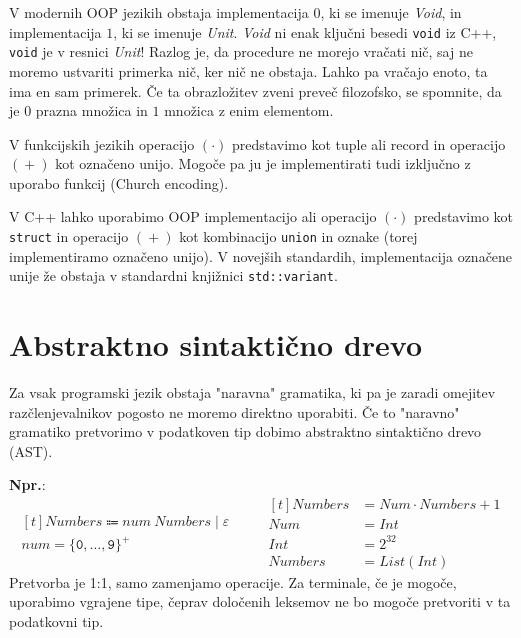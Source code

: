 \documentclass{report}
\newcommand{\Ex}{\textbf{Npr.}:\ }
\newcommand{\Null}{\varepsilon}
\newcommand{\Char}[1]{\texttt{#1}}
\newcommand{\Seq}{\cdot}
\newcommand{\Spc}{\ }
\newcommand{\Union}{\mathrel{|}}
\newcommand{\Sum}{\mathrel{+}}
\newcommand{\KleenePlus}[1]{#1^+}
\newcommand{\Arrow}{\Coloneq}
\newcommand{\NT}[1]{{#1}}
\newcommand{\T}[1]{{#1}}
\begin{document}
V modernih OOP jezikih obstaja implementacija $0$, ki se imenuje \emph{Void}, in implementacija $1$, ki se imenuje \emph{Unit}.
\emph{Void} ni enak ključni besedi \texttt{void} iz C++, \texttt{void} je v resnici \emph{Unit}!
Razlog je, da procedure ne morejo vračati nič, saj ne moremo ustvariti primerka nič, ker nič ne obstaja.
Lahko pa vračajo enoto, ta ima en sam primerek.
Če ta obrazložitev zveni preveč filozofsko, se spomnite, da je $0$ prazna množica in $1$ množica z enim elementom.

V funkcijskih jezikih operacijo ${(\Seq)}$ predstavimo kot tuple ali record in operacijo ${(\Sum)}$ kot označeno unijo.
Mogoče pa ju je implementirati tudi izključno z uporabo funkcij (Church encoding).

V C++ lahko uporabimo OOP implementacijo ali operacijo ${(\Seq)}$ predstavimo kot \texttt{struct} in operacijo ${(\Sum)}$ kot kombinacijo \texttt{union} in oznake (torej implementiramo označeno unijo).
V novejših standardih, implementacija označene unije že obstaja v standardni knjižnici \texttt{std::variant}.

\section{Abstraktno sintaktično drevo}
Za vsak programski jezik obstaja "naravna" gramatika, ki pa je zaradi omejitev razčlenjevalnikov pogosto ne moremo direktno uporabiti.
Če to "naravno" gramatiko pretvorimo v podatkoven tip dobimo abstraktno sintaktično drevo (AST).

\Ex
\begin{equation*}
  \begin{aligned}[t]
    \NT{Numbers} \Arrow \T{num} \Spc \NT{Numbers} \Union \Null\\[1em]
    \T{num} = \KleenePlus{\{\Char{0}, \dots, \Char{9}\}}
  \end{aligned}
  \qquad
  \begin{aligned}[t]
    Numbers &= Num \Seq Numbers \Sum 1\\
    Num &= Int\\
    Int &= 2^{32}\\
    Numbers &= List(Int)
  \end{aligned}
\end{equation*}
Pretvorba je 1:1, samo zamenjamo operacije.
Za terminale, če je mogoče, uporabimo vgrajene tipe, čeprav določenih leksemov ne bo mogoče pretvoriti v ta podatkovni tip.
\end{document}
